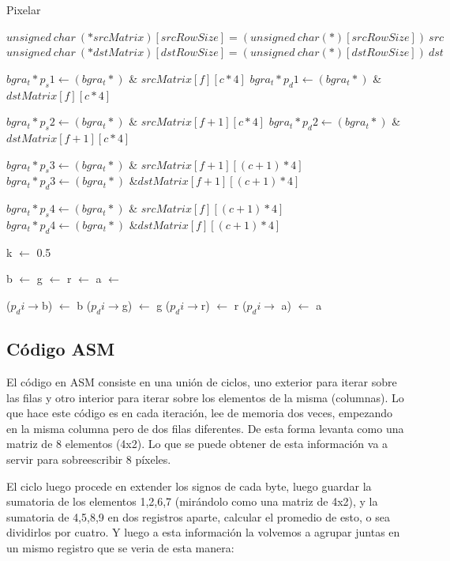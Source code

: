 	\begin{algorithm}[h!]
\caption{Pixelar}
\begin{algorithmic}
	\State $unsigned~ char~ (*srcMatrix)[srcRowSize] = (unsigned~ char (*)[srcRowSize])~ src$
	\State $unsigned~ char~ (*dstMatrix)[dstRowSize] = (unsigned~ char (*)[dstRowSize])~ dst$
	
			\State $bgra_t* p_s1 \gets (bgra_t*)$ \& $srcMatrix[f][c * 4]$
			\State $bgra_t *p_d1 \gets (bgra_t*)$ \&$dstMatrix[f][c * 4]$
			
			\State $bgra_t* p_s2 \gets (bgra_t*)$ \& $srcMatrix[f+1][c * 4]$
			\State $bgra_t *p_d2 \gets (bgra_t*)$ \&$dstMatrix[f+1][c * 4]$
			
			\State $bgra_t* p_s3 \gets (bgra_t*)$ \& $srcMatrix[f+1][(c+1) * 4]$
			\State $bgra_t *p_d3 \gets (bgra_t*)$ \&$dstMatrix[f+1][(c+1) * 4]$
			
			\State $bgra_t* p_s4 \gets (bgra_t*)$ \& $srcMatrix[f][(c+1) * 4]$
			\State $bgra_t *p_d4 \gets (bgra_t*)$ \&$dstMatrix[f][(c+1) * 4]$
			
			\State k $\gets$ 0.5
			
			\State b $\gets$ 
			\State g $\gets$ 
			\State r $\gets$ 
			\State a $\gets$ 
				
				\State ($p_di \rightarrow$b) $\gets$ b
				\State ($p_di \rightarrow$g) $\gets$ g
				\State ($p_di \rightarrow$r) $\gets$ r
				\State ($p_di \rightarrow$ a) $\gets$ a
			\EndFor
		\EndFor
	\EndFor
\EndFunction

\end{algorithmic} 
\end{algorithm}
\subsection{Código ASM}
\par{El código en ASM consiste en una unión de ciclos, uno exterior para iterar sobre las filas y otro interior para iterar sobre los elementos de la misma (columnas). Lo que hace este código es en cada iteración, lee de memoria dos veces, empezando en la misma columna pero de dos filas diferentes. De esta forma levanta como una matriz de 8 elementos (4x2). Lo que se puede obtener de esta información va a servir para sobreescribir 8 píxeles.}
\par{El ciclo luego procede en extender los signos de cada byte, luego guardar la sumatoria de los elementos {1,2,6,7} (mirándolo como una matriz de 4x2), y la sumatoria de {4,5,8,9} en dos registros aparte, calcular el promedio de esto, o sea dividirlos por cuatro. Y luego a esta información la volvemos a agrupar juntas en un mismo registro que se veria de esta manera:}

